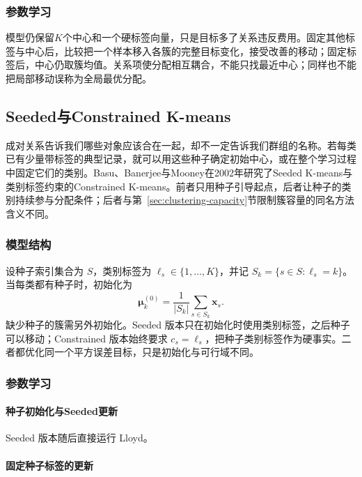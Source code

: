 \subsubsection{参数学习}

模型仍保留$K$个中心和一个硬标签向量，只是目标多了关系违反费用。固定其他标签与中心后，比较把一个样本移入各簇的完整目标变化，接受改善的移动；固定标签后，中心仍取簇均值。关系项使分配相互耦合，不能只找最近中心；同样也不能把局部移动误称为全局最优分配。
\subsection{Seeded与Constrained K-means}
\label{sec:clustering-seeded}

成对关系告诉我们哪些对象应该合在一起，却不一定告诉我们群组的名称。若每类已有少量带标签的典型记录，就可以用这些种子确定初始中心，或在整个学习过程中固定它们的类别。Basu、Banerjee与Mooney在2002年研究了Seeded K-means与类别标签约束的Constrained K-means。前者只用种子引导起点，后者让种子的类别持续参与分配条件；后者与第~\ref{sec:clustering-capacity}节限制簇容量的同名方法含义不同。

\subsubsection{模型结构}

设种子索引集合为 $S$，类别标签为 $\ell_s\in\{1,\ldots,K\}$，并记 $S_k=\{s\in S:\ell_s=k\}$。当每类都有种子时，初始化为
\[
 \bm{\mu}_k^{(0)}
 =\frac{1}{|S_k|}\sum_{s\in S_k}\bm{x}_s.
\]
缺少种子的簇需另外初始化。Seeded 版本只在初始化时使用类别标签，之后种子可以移动；Constrained 版本始终要求 $c_s=\ell_s$，把种子类别标签作为硬事实。二者都优化同一个平方误差目标，只是初始化与可行域不同。

\subsubsection{参数学习}

\paragraph{种子初始化与Seeded更新}

Seeded 版本随后直接运行 Lloyd。

\paragraph{固定种子标签的更新}

